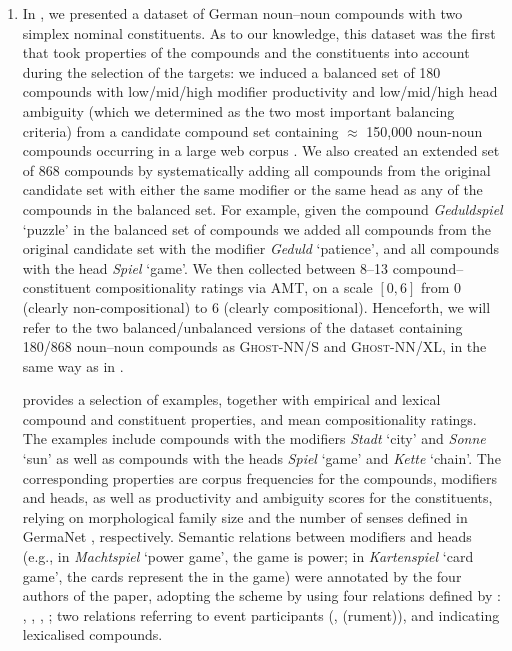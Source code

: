 \documentclass[output=paper,colorlinks,citecolor=brown]{langscibook}
\begin{document}
\begin{enumerate}[label=(\arabic*), resume] 
\item In \citet{SchulteImWaldeEtAl:16a}, we presented a dataset of German noun--noun compounds with two simplex nominal constituents. As to our knowledge, this dataset was the first that took properties of the compounds and the constituents into account during the selection of the targets: we induced a balanced set of 180 compounds with low/mid/high modifier productivity and low/mid/high head ambiguity (which we determined as the two most important balancing criteria) from a candidate compound set containing $\approx$ 150,000 noun-noun compounds occurring in a large web corpus \citep{Schaefer/Bildhauer:12}. We also created an extended set of 868 compounds by systematically adding all compounds from the original candidate set with either the same modifier or the same head as any of the compounds in the balanced set. For example, given the compound \textit{Geduldspiel} `puzzle' in the balanced set of compounds we added all compounds from the original candidate set with the modifier \textit{Geduld} `patience', and all compounds with the head \textit{Spiel} `game'. We then collected between 8--13 compound--constituent compositionality ratings via AMT, on a scale $[0,6]$ from 0 (clearly non-compositional) to 6 (clearly compositional). Henceforth, we will refer to the two balanced/unbalanced versions of the dataset containing 180/868 noun--noun compounds as \textsc{Ghost-NN/S} and \textsc{Ghost-NN/XL}, in the same way as in \citet{SchulteImWaldeEtAl:16b}.

 provides a selection of examples, together with empirical and lexical compound and constituent properties, and mean compositionality ratings. The examples include compounds with the modifiers \textit{Stadt} `city' and \textit{Sonne} `sun' as well as compounds with the heads \textit{Spiel} `game' and \textit{Kette} `chain'. The corresponding properties are corpus frequencies for the compounds, modifiers and heads, as well as productivity and ambiguity scores for the constituents, relying on morphological family size \citep{deJongEtAl:02} and the number of senses defined in GermaNet \citep{Hamp/Feldweg:97, Kunze:00}, respectively. Semantic relations between modifiers and heads (e.g., in \textit{Machtspiel} `power game', the game is  power; in \textit{Kartenspiel} `card game', the cards represent the  in the game) were annotated by the four authors of the paper, adopting the scheme by \citet{OSeaghdha:07} using four relations defined by \citet{Levi:78}: , , , ; two relations referring to event participants (, (rument)), and  indicating lexicalised compounds.
\end{enumerate}
\end{document}
